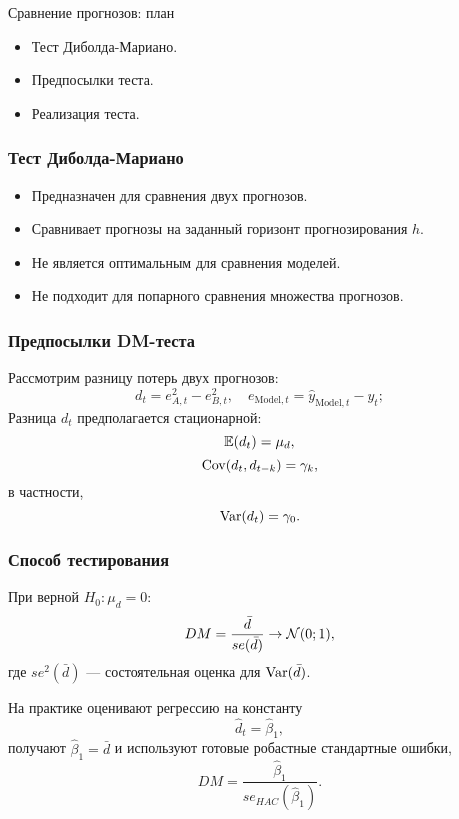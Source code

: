 
\begin{frame} %


\end{frame}



\begin{frame}{Сравнение прогнозов: план}
  \begin{itemize}[<+->]
    \item Тест Диболда-Мариано.
    \item \alert{Предпосылки} теста.
    \item Реализация теста. 
  \end{itemize}

\end{frame}

\begin{frame}
  \frametitle{Тест Диболда-Мариано}

  \begin{itemize}[<+->]
    \item Предназначен для сравнения \alert{двух} прогнозов.
    \item Сравнивает прогнозы на \alert{заданный горизонт} прогнозирования $h$.
    \item Не является оптимальным для \alert{сравнения моделей}. 
    \item Не подходит для \alert{попарного} сравнения множества прогнозов.
  \end{itemize}
  
\end{frame}

\begin{frame}
  \frametitle{Предпосылки DM-теста}

  Рассмотрим \alert{разницу потерь} двух прогнозов:
  \[
  d_t = e_{A,t}^2 - e_{B,t}^2, \quad e_{\text{Model},t} = \hat y_{\text{Model},t} - y_t;
  \]
  \pause
  Разница $d_t$ предполагается \alert{стационарной}:\pause
  \[
  \mathbb{E}(d_t) = \mu_d,
  \]
  \pause 
  \[
  \operatorname{Cov}(d_t, d_{t-k}) = \gamma_k,    
  \] \pause
  в частности,
  \[
  \operatorname{Var}(d_t) = \gamma_0.    
  \]
  
\end{frame}

\begin{frame}
    \frametitle{Способ тестирования}
    При верной $H_0: \mu_d = 0$:
    \[
       DM = \frac{\bar d}{se(\bar d)} \to \mathcal{N}(0;1),
    \]
    где $se^2(\bar d)$ — состоятельная оценка для $\operatorname{Var}(\bar d)$.
    \pause 

    На практике оценивают регрессию на константу
    \[
    \hat d_t = \hat \beta_1,
    \]
    \pause 
    получают $\hat\beta_1 = \bar d$ и используют готовые \alert{робастные стандартные ошибки},
    \[
        DM = \frac{\hat \beta_1}{se_{HAC}(\hat\beta_1)}.
    \]
\end{frame}

